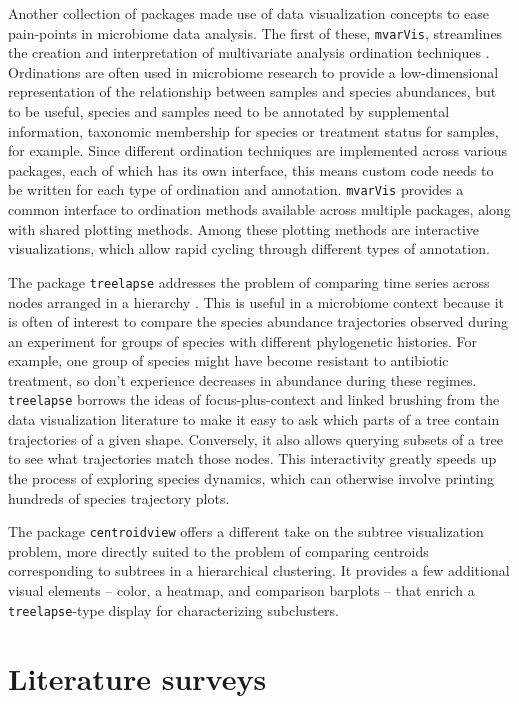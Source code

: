 \documentclass{article}
\begin{document}
Another collection of packages made use of data visualization concepts to ease
pain-points in microbiome data analysis. The first of these, \texttt{mvarVis},
streamlines the creation and interpretation of multivariate analysis ordination
techniques \citep{mvarvis}. Ordinations are often used in microbiome research to
provide a low-dimensional representation of the relationship between samples and
species abundances, but to be useful, species and samples need to be annotated
by supplemental information, taxonomic membership for species or treatment
status for samples, for example. Since different ordination techniques are
implemented across various packages, each of which has its own interface, this
means custom code needs to be written for each type of ordination and
annotation. \texttt{mvarVis} provides a common interface to ordination methods
available across multiple packages, along with shared plotting methods. Among
these plotting methods are interactive visualizations, which allow rapid cycling
through different types of annotation.

The package \texttt{treelapse} addresses the problem of comparing time series
across nodes arranged in a hierarchy \citep{Sankaran2017}. This is useful in a
microbiome context because it is often of interest to compare the species
abundance trajectories observed during an experiment for groups of species with
different phylogenetic histories. For example, one group of species might have
become resistant to antibiotic treatment, so don't experience decreases in
abundance during these regimes. \texttt{treelapse} borrows the ideas of
focus-plus-context and linked brushing from the data visualization literature to
make it easy to ask which parts of a tree contain trajectories of a given shape.
Conversely, it also allows querying subsets of a tree to see what trajectories
match those nodes. This interactivity greatly speeds up the process of exploring
species dynamics, which can otherwise involve printing hundreds of species
trajectory plots.

The package \texttt{centroidview} offers a different take on the subtree
visualization problem, more directly suited to the problem of comparing
centroids corresponding to subtrees in a hierarchical clustering. It provides a
few additional visual elements -- color, a heatmap, and comparison barplots --
that enrich a \texttt{treelapse}-type display for characterizing subclusters.

\section{Literature surveys}
\end{document}
